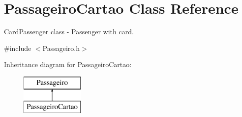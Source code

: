\hypertarget{class_passageiro_cartao}{}\section{Passageiro\+Cartao Class Reference}
\label{class_passageiro_cartao}


Card\+Passenger class -\/ Passenger with card.  




{\ttfamily \#include $<$Passageiro.\+h$>$}

Inheritance diagram for Passageiro\+Cartao\+:\begin{figure}[H]
\begin{center}
\leavevmode
\includegraphics[height=2.000000cm]{class_passageiro_cartao}
\end{center}
\end{figure}

